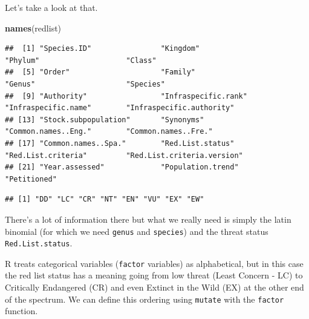 \documentclass[
  a4paperpaper,
]{book}
\newenvironment{Shaded}{\begin{snugshade}}{\end{snugshade}}
\newcommand{\KeywordTok}[1]{\textcolor[rgb]{0.13,0.29,0.53}{\textbf{#1}}}
\newcommand{\NormalTok}[1]{#1}
\newcommand{\OperatorTok}[1]{\textcolor[rgb]{0.81,0.36,0.00}{\textbf{#1}}}
\begin{document}
Let's take a look at that.

\begin{Shaded}
\begin{Highlighting}[]
\KeywordTok{names}\NormalTok{(redlist)}
\end{Highlighting}
\end{Shaded}

\begin{verbatim}
##  [1] "Species.ID"                "Kingdom"                   "Phylum"                    "Class"                    
##  [5] "Order"                     "Family"                    "Genus"                     "Species"                  
##  [9] "Authority"                 "Infraspecific.rank"        "Infraspecific.name"        "Infraspecific.authority"  
## [13] "Stock.subpopulation"       "Synonyms"                  "Common.names..Eng."        "Common.names..Fre."       
## [17] "Common.names..Spa."        "Red.List.status"           "Red.List.criteria"         "Red.List.criteria.version"
## [21] "Year.assessed"             "Population.trend"          "Petitioned"
\end{verbatim}

\begin{Shaded}
\end{Shaded}

\begin{verbatim}
## [1] "DD" "LC" "CR" "NT" "EN" "VU" "EX" "EW"
\end{verbatim}

There's a lot of information there but what we really need is simply the latin binomial (for which we need \texttt{genus} and \texttt{species}) and the threat status \texttt{Red.List.status}.

R treats categorical variables (\texttt{factor} variables) as alphabetical, but in this case the red list status has a meaning going from low threat (Least Concern - LC) to Critically Endangered (CR) and even Extinct in the Wild (EX) at the other end of the spectrum. We can define this ordering using \texttt{mutate} with the \texttt{factor} function.
\end{document}
